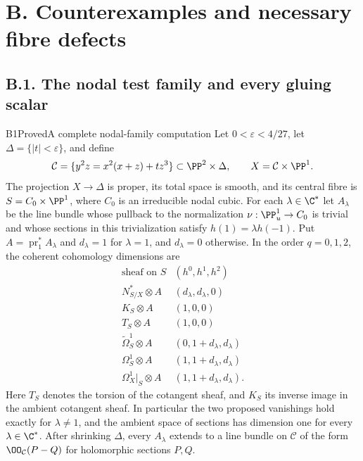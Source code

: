
\section{B. Counterexamples and necessary fibre defects}

\subsection{B.1. The nodal test family and every gluing scalar}


\begin{statement}{B1}{Proved}{A complete nodal-family computation}
Let $0<\varepsilon<4/27$, let $\Delta=\{|t|<\varepsilon\}$, and define
\[
 \mathcal C=\{y^2z=x^2(x+z)+tz^3\}\subset\PP^2\times\Delta,
 \qquad X=\mathcal C\times\PP^1.
\]
The projection $X\to\Delta$ is proper, its total space is smooth, and its central fibre is $S=C_0\times\PP^1$, where $C_0$ is an irreducible nodal cubic. For each $\lambda\in\C^*$ let $A_\lambda$ be the line bundle whose pullback to the normalization $\nu:\PP^1_u\to C_0$ is trivial and whose sections in this trivialization satisfy $h(1)=\lambda h(-1)$. Put $A=\operatorname{pr}_1^*A_\lambda$ and $d_\lambda=1$ for $\lambda=1$, and $d_\lambda=0$ otherwise. In the order $q=0,1,2$, the coherent cohomology dimensions are
\[
\begin{array}{c|c}
\text{sheaf on }S & (h^0,h^1,h^2)\\\hline
 N^*_{S/X}\otimes A &(d_\lambda,d_\lambda,0)\\
 K_S\otimes A &(1,0,0)\\
 T_S\otimes A &(1,0,0)\\
 \widetilde\Omega^1_S\otimes A &(0,1+d_\lambda,d_\lambda)\\
 \Omega^1_S\otimes A &(1,1+d_\lambda,d_\lambda)\\
 \Omega^1_X|_S\otimes A &(1,1+d_\lambda,d_\lambda).
\end{array}                                                    \tag{B.1}
\]
Here $T_S$ denotes the torsion of the cotangent sheaf, and $K_S$ its inverse image in the ambient cotangent sheaf. In particular the two proposed vanishings hold exactly for $\lambda\ne1$, and the ambient space of sections has dimension one for every $\lambda\in\C^*$. After shrinking $\Delta$, every $A_\lambda$ extends to a line bundle on $\mathcal C$ of the form $\OO_{\mathcal C}(P-Q)$ for holomorphic sections $P,Q$.
\end{statement}

